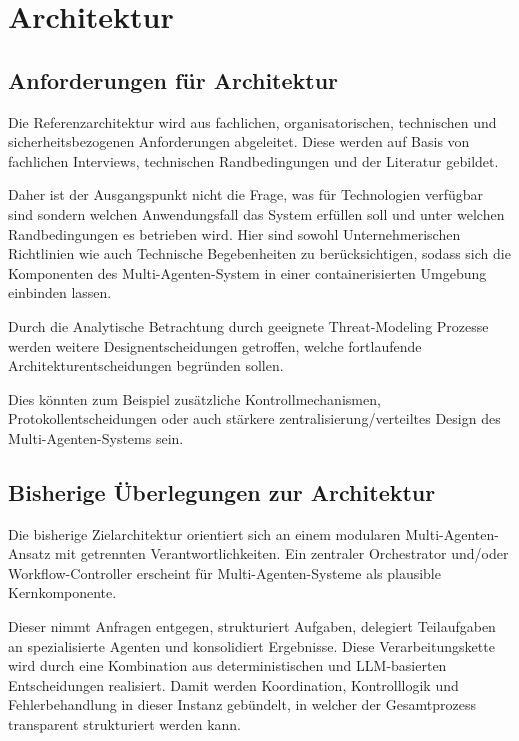 %

\section{Architektur}

\subsection{Anforderungen für Architektur}

Die Referenzarchitektur wird aus fachlichen, organisatorischen, technischen und sicherheitsbezogenen Anforderungen abgeleitet. Diese werden auf Basis von fachlichen Interviews, technischen Randbedingungen und der Literatur gebildet. 

Daher ist der Ausgangspunkt nicht die Frage, was für Technologien verfügbar sind sondern welchen Anwendungsfall das System erfüllen soll und unter welchen Randbedingungen es betrieben wird. Hier sind sowohl Unternehmerischen Richtlinien wie auch Technische Begebenheiten zu berücksichtigen, sodass sich die Komponenten des Multi-Agenten-System in einer containerisierten Umgebung einbinden lassen.

Durch die Analytische Betrachtung durch geeignete Threat-Modeling Prozesse werden weitere Designentscheidungen getroffen, welche fortlaufende Architekturentscheidungen begründen sollen.

Dies könnten zum Beispiel zusätzliche Kontrollmechanismen, Protokollentscheidungen oder auch stärkere zentralisierung/verteiltes Design des Multi-Agenten-Systems sein.

\subsection{Bisherige Überlegungen zur Architektur}

Die bisherige Zielarchitektur orientiert sich an einem modularen Multi-Agenten-Ansatz mit getrennten Verantwortlichkeiten. Ein zentraler Orchestrator und/oder Workflow-Controller erscheint für Multi-Agenten-Systeme als plausible Kernkomponente. \cite{georgeff_communication_1983,jennings_roadmap_1998, vashishtha_cosmic_2026}

Dieser nimmt Anfragen entgegen, strukturiert Aufgaben, delegiert Teilaufgaben an spezialisierte Agenten und konsolidiert Ergebnisse. \cite{sycara_distributed_1996, xue_all--one_2024} Diese Verarbeitungskette wird durch eine Kombination aus deterministischen und LLM-basierten Entscheidungen realisiert. Damit werden Koordination, Kontrolllogik und Fehlerbehandlung in dieser Instanz gebündelt, in welcher der Gesamtprozess transparent strukturiert werden kann. \cite{wong_adding_2000} 

